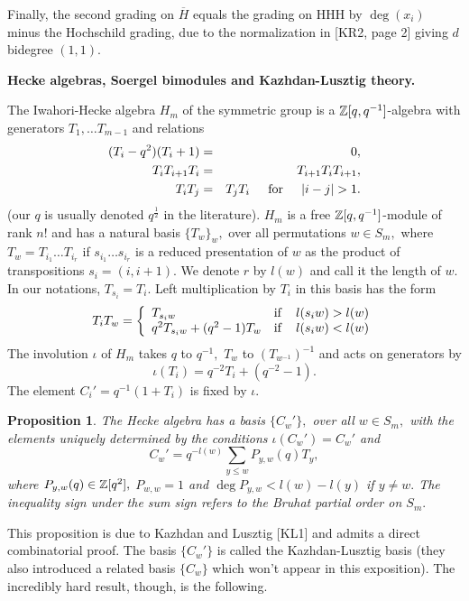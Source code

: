 \documentclass[12pt]{article}
\newtheorem{prop}{Proposition}
\begin{document}
Finally, the second grading on $\overline{H}$ equals 
the grading on $\mathrm{HHH}$ by $\deg(x_i)$ minus 
the Hochschild grading, due to the normalization in [KR2, page 2] 
giving $d$ bidegree $(1,1).$ 

\vspace{0.15in} 

{\bf Hecke algebras, Soergel bimodules and Kazhdan-Lusztig theory.} 

\noindent
The Iwahori-Hecke algebra $H_m$ of the symmetric group is a $\mathbb Z[q,q^{-1}]$-algebra
 with generators $T_1,\dots T_{m-1}$ and relations 
\begin{eqnarray*} 
  (T_i-q^2)(T_i+1) & = & 0, \\ 
   T_i T_{i+1}T_i & = & T_{i+1} T_i T_{i+1}, \\
   T_i T_j  & = & T_j T_i \hspace{0.2in} \mathrm{for} \hspace{0.2in} 
   |i-j|>1.
 \end{eqnarray*} 
(our $q$ is usually denoted $q^{\frac{1}{2}}$ in the literature).  
$H_m$ is a free $\mathbb Z[q,q^{-1}]$-module of rank $n!$ and has 
a natural basis  $\{T_w\}_w,$ over all permutations $w\in S_m,$ where 
$T_w=T_{i_1}\dots T_{i_r}$ if $s_{i_1}\dots s_{i_r}$ is a reduced 
presentation of $w$ as the product of transpositions $s_i=(i,i+1).$ 
We denote $r$ by $l(w)$ and call it the length of $w.$ In our notations, 
$T_{s_i}=T_i.$ Left multiplication 
by $T_i$ in this basis has the form 
$$T_i T_w = \left\{ \begin{array}{ll} T_{s_iw} & \mathrm{if} 
  \hspace{0.15in} l(s_iw)> l(w) \\ q^2 T_{s_iw} + (q^2-1)T_w & \mathrm{if} 
  \hspace{0.15in} l(s_iw) < l(w) \end{array} \right.$$ 
The involution $\iota$ of $H_m$ takes $q$ to $q^{-1},$ 
 $T_w$ to $(T_{w^{-1}})^{-1}$ and acts on generators by 
$$ \iota(T_i) = q^{-2} T_i +(q^{-2}-1).$$ 
The element $C_i'= q^{-1}(1+T_i)$ is fixed by 
$\iota.$ 

\begin{prop} The Hecke algebra has a basis $\{C_w'\},$ over all $w\in S_m,$ 
with the elements uniquely determined by the conditions 
$\iota(C_w')= C_w'$ and
$$ C_w'= q^{-l(w)} \sum_{y\le w} P_{y,w}(q) T_y,$$ 
where $P_{y,w}(q)\in \mathbb Z[q^2], $ $P_{w,w}=1$ and 
$\deg P_{y,w}< l(w) -l(y)$ if $y\not= w.$ The inequality sign 
under the sum sign refers to the Bruhat partial order on $S_m.$ 
\end{prop} 

This proposition is due to Kazhdan and Lusztig [KL1] and admits a direct 
combinatorial proof. The basis $\{C_w'\}$ is called the Kazhdan-Lusztig 
basis (they also introduced a related basis $\{C_w\}$ which won't appear 
in this exposition).  The incredibly hard result, though, is the following. 
\end{document}
